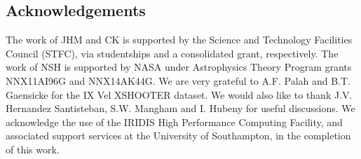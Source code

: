 \documentclass[preprint, a4paper, 11pt]{aastex}
\begin{document}
\subsection*{Acknowledgements}
The work of JHM and CK is supported by the Science and Technology Facilities Council (STFC), 
via studentships and a consolidated grant, respectively. The work of NSH is supported by NASA under Astrophysics Theory Program grants NNX11AI96G  and NNX14AK44G.
We are very grateful to A.F. Palah and B.T. Gaensicke for the IX Vel XSHOOTER dataset.
We would also like to thank J.V. Hernandez Santisteban, S.W. Mangham and I. Hubeny for useful discussions. We acknowledge the use of the IRIDIS High Performance Computing Facility, 
and associated support services at the University of Southampton, in the completion of this work.



\end{document}
